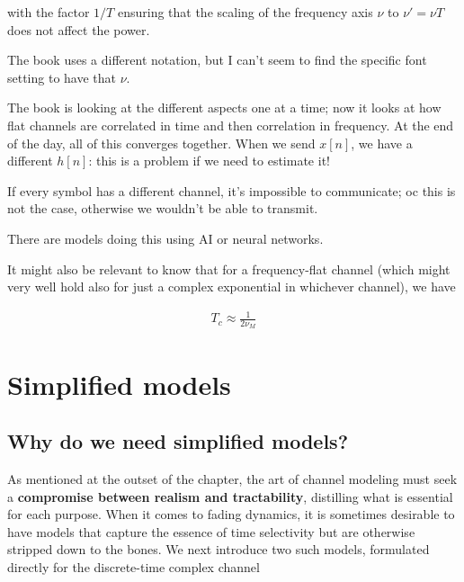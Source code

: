 \documentclass[a4paper, 12pt]{book}
\begin{document}
with the factor $1/T$ ensuring that the scaling of the frequency axis $\nu$ to $\nu' = \nu T$ does not affect the power.

\begin{greenbar}
The book uses a different notation, but I can't seem to find the specific font setting to have that $\nu$.
\end{greenbar}

The book is looking at the different aspects one at a time; now it looks at how flat channels are correlated in time and then correlation in frequency. At the end of the day, all of this converges together.
When we send $x[n]$, we have a different $h[n]$: this is a problem if we need to estimate it!



If every symbol has a different channel, it's impossible to communicate; oc this is not the case, otherwise we wouldn't be able to transmit.

\begin{greenbar}
There are models doing this using AI or neural networks.
\end{greenbar}

It might also be relevant to know that for a frequency-flat channel (which might very well hold also for just a complex exponential in whichever channel), we have

\begin{align}
T_c \approx \frac{1}{2\nu_M} \tag{3.59}
\end{align}

\section{Simplified models}

\subsection{Why do we need simplified models?}

\begin{yellowbox}
As mentioned at the outset of the chapter, the art of channel modeling must seek a \textbf{compromise between realism and tractability}, distilling what is essential for each purpose. When it comes to fading dynamics, it is sometimes desirable to have models that capture the essence of time selectivity but are otherwise stripped down to the bones. We next introduce two such models, formulated directly for the discrete-time complex channel
\end{yellowbox}
\end{document}
